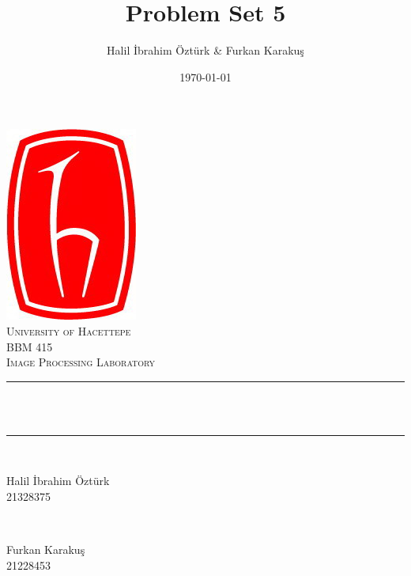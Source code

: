 \documentclass[12pt]{article}
\title{Problem Set 5}                             %
\author{Halil \.{I}brahim \"{O}zt\"{u}rk \& Furkan Karaku{ş}}               %
\date{\today}                                           %
\makeatletter
\let\thetitle\@title
\let\thedate\@date
\makeatother
\begin{document}

\begin{titlepage}
    \centering
    \vspace*{0.5 cm}
    \includegraphics[scale = 0.5]{hacettepe.jpg}\\[1.0 cm]   %
    \textsc{\LARGE University of Hacettepe}\\[2.0 cm]   %
    \textsc{\Large BBM 415}\\[0.5 cm]               %
    \textsc{\large Image Processing Laboratory}\\[0.5 cm]               %
    \rule{\linewidth}{0.2 mm} \\[0.4 cm]
    { \huge \bfseries \thetitle}\\
    \rule{\linewidth}{0.2 mm} \\[1.5 cm]
    
    \begin{minipage}{0.4\textwidth}
        \begin{flushleft} \large
	   Halil \.{I}brahim \"{O}zt\"{u}rk \\
            21328375                                   %

         \end{flushleft}
            \end{minipage}~
            \begin{minipage}{0.4\textwidth}
         \begin{flushright} \large
            Furkan Karaku{ş}\\
            21228453                                   %

        \end{flushright}
    \end{minipage}\\[2 cm]
    
    {\large \thedate}\\[2 cm]
 
    \vfill
    
\end{titlepage}
\end{document}
